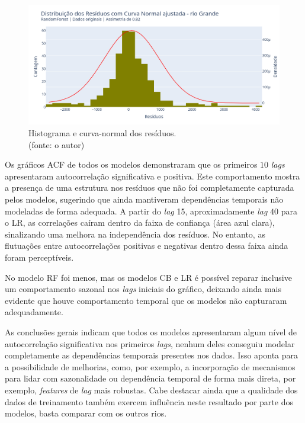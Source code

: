 \begin{figure}[!h]
	\centering
	\includegraphics[scale=0.33]{Figuras/rio_grande/wfv/RF/RF_WFV_ORIG_RESID_x_CURVA_NORMAL.png}
	\caption{Histograma e curva-normal dos resíduos.\\(fonte: o autor)}
	\label{fig:grande_RF_WFV_ORIG_RESID_x_CURVA_NORMAL}
\end{figure}
\clearpage

Os gráficos ACF de todos os modelos demonstraram que os primeiros $10$ \textit{lags} apresentaram autocorrelação significativa e positiva. Este comportamento mostra a presença de uma estrutura nos resíduos que não foi completamente capturada pelos modelos, sugerindo que ainda mantiveram dependências temporais não modeladas de forma adequada. A partir do \textit{lag} 15, aproximadamente \textit{lag} $40$ para o LR, as correlações caíram dentro da faixa de confiança (área azul clara), sinalizando uma melhora na independência dos resíduos. No entanto, as flutuações entre autocorrelações positivas e negativas dentro dessa faixa ainda foram perceptíveis.

No modelo RF foi menos, mas os modelos CB e LR é possível reparar inclusive um comportamento sazonal nos \textit{lags} iniciais do gráfico, deixando ainda mais evidente que houve comportamento temporal que os modelos não capturaram adequadamente.

As conclusões gerais indicam que todos os modelos apresentaram algum nível de autocorrelação significativa nos primeiros \textit{lags}, nenhum deles conseguiu modelar completamente as dependências temporais presentes nos dados. Isso aponta para a possibilidade de melhorias, como, por exemplo, a incorporação de mecanismos para lidar com sazonalidade ou dependência temporal de forma mais direta, por exemplo, \textit{features} de \textit{lag} mais robustas. Cabe destacar ainda que a qualidade dos dados de treinamento também exercem influência neste resultado por parte dos modelos, basta comparar com os outros rios.

